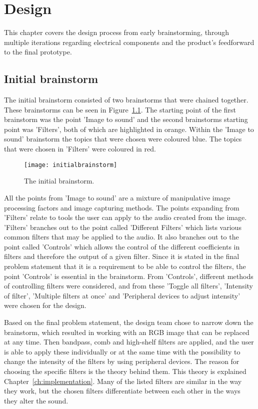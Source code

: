 \chapter{Design}\label{ch:design}
This chapter covers the design process from early brainstorming, through multiple iterations regarding electrical components and the product's feedforward to the final prototype. 

\section{Initial brainstorm}\label{sec:initialbrainstorm}
The initial brainstorm consisted of two brainstorms that were chained together. These brainstorms can be seen in Figure~\ref{fig:initialbrainstorm}. The starting point of the first brainstorm was the point 'Image to sound' and the second brainstorms starting point was 'Filters', both of which are highlighted in orange. Within the 'Image to sound' brainstorm the topics that were chosen were coloured blue. The topics that were chosen in 'Filters' were coloured in red. 

\begin{figure}[!h] 
\centering
\texttt{[image: initialbrainstorm]}
\caption{\label{fig:initialbrainstorm} The initial brainstorm.}
\end{figure}

All the points from 'Image to sound' are a mixture of manipulative image processing factors and image capturing methods.  The points expanding from 'Filters' relate to tools the user can apply to the audio created from the image. 'Filters' branches out to the point called 'Different Filters' which lists various common filters that may be applied to the audio. It also branches out to the point called 'Controls' which allows the control of the different coefficients in filters and therefore the output of a given filter. Since it is stated in the final problem statement that it is a requirement to be able to control the filters, the point 'Controls' is essential in the brainstorm. From 'Controls', different methods of controlling filters were considered, and from these 'Toggle all filters', 'Intensity of filter', 'Multiple filters at once' and 'Peripheral devices to adjust intensity' were chosen for the design.

Based on the final problem statement, the design team chose to narrow down the brainstorm, which resulted in working with an RGB image that can be replaced at any time. Then bandpass, comb and high-shelf filters are applied, and the user is able to apply these individually or at the same time with the possibility to change the intensity of the filters by using peripheral devices. The reason for choosing the specific filters is the theory behind them. This theory is explained Chapter~\ref{ch:implementation}. Many of the listed filters are similar in the way they work, but the chosen filters differentiate between each other in the ways they alter the sound.

